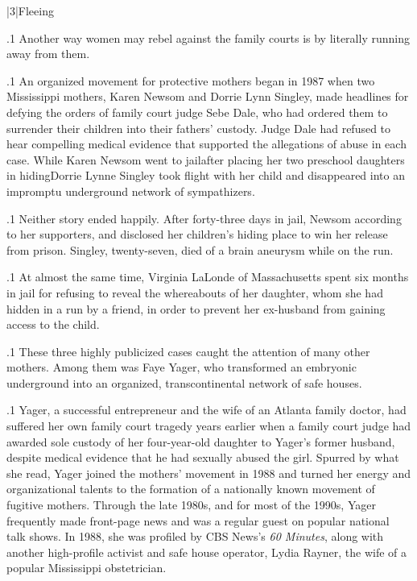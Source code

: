 \documentclass[11pt, twoside]{article}
\begin{document}
{\s|3|{Fleeing}

\p.1{%
\noindent{}\:Another way women may rebel against the family courts is by literally
running away from them.\;
}%

\p.1{%
\:An organized  movement for protective mothers began in 1987 when two Mississippi mothers, Karen Newsom and Dorrie
Lynn Singley, made headlines for defying the orders of family court
judge Sebe Dale, who had ordered them to surrender their children
into their fathers’ custody. Judge Dale had refused to hear compelling
medical evidence that supported the allegations of abuse in each case.
While Karen Newsom went to jail\mdash{}after placing her two preschool daughters
in hiding\mdash{}Dorrie Lynne Singley took flight with her child and disappeared into an
impromptu underground network of sympathizers.\;
}%

\p.1{%
\:Neither story ended happily. After forty-three days in jail, Newsom
 according to her supporters, and disclosed her children’s hiding
place to win her release from prison. Singley, twenty-seven, died of a
brain aneurysm while on the run.\;
}%

\p.1{%
\:At almost the same time, Virginia LaLonde of Massachusetts spent
six months in jail for refusing to reveal the whereabouts of her daughter,
whom she had hidden in a  run by a friend, in order to prevent her
ex-husband from gaining access to the child.\;
}%

\p.1{%
\:These three highly publicized cases caught the attention of many
other mothers. Among them was Faye Yager, who transformed an embryonic underground into an organized, transcontinental network of safe
houses.\;
}%

\p.1{%
\:Yager, a successful entrepreneur and the wife of an Atlanta family
doctor, had suffered her own family court tragedy years earlier when
a family court judge had awarded sole custody of her four-year-old
daughter to Yager’s former husband, despite medical evidence that he
had sexually abused the girl. Spurred by what she read, Yager joined the
mothers’ movement in 1988 and turned her energy and organizational
talents to the formation of a nationally known movement of fugitive
mothers. Through the late 1980s, and for most of the 1990s, Yager
frequently made front-page news and was a regular guest on popular
national talk shows. In 1988, she was profiled by
CBS News’s \textit{60 Minutes}, along with another high-profile activist and safe house operator,
Lydia Rayner, the wife of a popular Mississippi obstetrician.\;
}%

}
\end{document}
